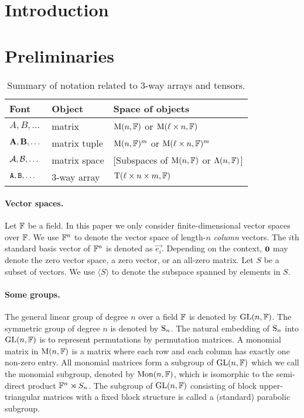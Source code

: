 \documentclass[11pt]{article}
\begin{document}
\newpage
{}     %

\section{Introduction}\label{sec:intro}



\section{Preliminaries}\label{sec:prel}

\begin{table}[!htbp]
\begin{center}
\begin{tabular}{lll}
Font & Object & Space of objects \\ \hline
$A, B, \dotsc$ & matrix & $\M(n,\F)$ or $\M(\ell \times n, \F)$ \\
$\vA, \vB, \dotsc$ & matrix tuple & $\M(n,\F)^m$ or $\M(\ell \times n, \F)^m$ \\
$\cA, \cB, \dotsc$ & matrix space & [Subspaces of 
$\M(n,\F)$ or $\Lambda(n,\F)$]\\
$\tA, \tB, \dotsc$ & 3-way array & $\T(\ell \times n \times m, \F)$
\end{tabular}
\end{center}
\caption{\label{table:notation} Summary of notation related to 3-way arrays and tensors.}
\end{table}
\paragraph{Vector spaces.}
Let $\F$ be a field. In this paper we only consider 
finite-dimensional vector spaces over $\F$. We use $\F^n$ to denote the 
vector space of 
length-$n$ \emph{column} vectors. The $i$th standard basis 
vector of $\F^n$ is denoted as 
$\vec{e_i}$. Depending on the context, $\vzero$ may denote the zero vector space, 
a zero vector, or an all-zero matrix. Let $S$ be 
a subset of 
vectors. We use $\langle S\rangle$ to denote the subspace 
spanned by elements in $S$. 

\paragraph{Some groups.} The general linear group of degree $n$ over a field $\F$ 
is denoted by $\GL(n, \F)$. The symmetric group of degree $n$ is denoted by 
$\S_n$. The natural embedding of $\S_n$ into $\GL(n, \F)$ is to represent 
permutations by permutation matrices. A monomial matrix in $\M(n, \F)$ is a matrix 
where each row and each column has exactly one non-zero entry. All monomial 
matrices form a subgroup of $\GL(n, \F)$ which we call the monomial 
subgroup, denoted by $\Mon(n, \F)$, which is isomorphic to the semi-direct product 
$\F^n \rtimes S_n$.
The subgroup of $\GL(n, \F)$ consisting of block upper-triangular matrices with a 
fixed block structure is called a (standard) parabolic subgroup. 
\end{document}
